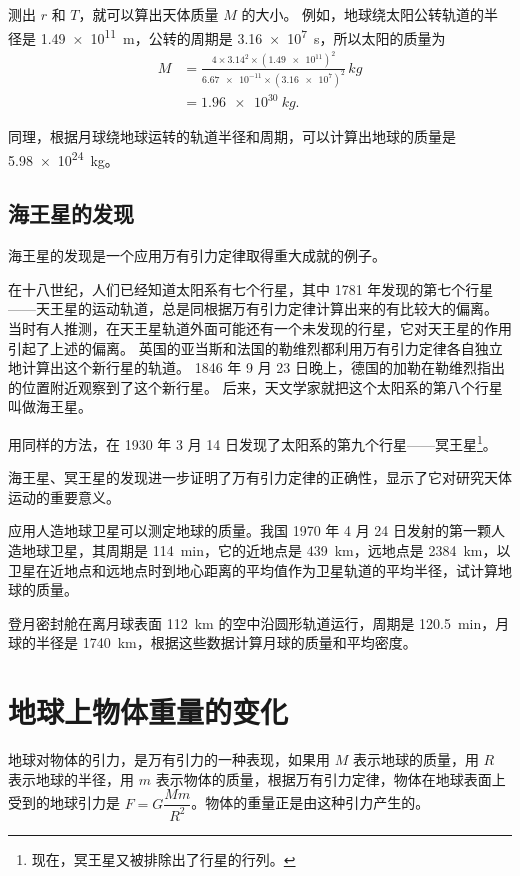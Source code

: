 测出 $r$ 和 $T$，就可以算出天体质量 $M$ 的大小。
例如，地球绕太阳公转轨道的半径是 \qty{1.49e11}{m}，公转的周期是 \qty{3.16e7}{s}，所以太阳的质量为
\[\begin{split}
M&= \frac{4\times 3.14^2\times (\num{1.49e11})^2}{\num{6.67e-11}\times (\num{3.16e7})^2}\,\unit{kg}\\
&=\qty{1.96e30}{kg}.
\end{split} \]

同理，根据月球绕地球运转的轨道半径和周期，可以计算出地球的质量是 \qty{5.98e24}{kg}。

\subsection{海王星的发现} 
海王星的发现是一个应用万有引力定律取得重大成就的例子。

在十八世纪，人们已经知道太阳系有七个行星，其中 1781 年发现的第七个行星——天王星的运动轨道，总是同根据万有引力定律计算出来的有比较大的偏离。
当时有人推测，在天王星轨道外面可能还有一个未发现的行星，它对天王星的作用引起了上述的偏离。
英国的亚当斯和法国的勒维烈都利用万有引力定律各自独立地计算出这个新行星的轨道。
1846 年 9 月 23 日晚上，德国的加勒在勒维烈指出的位置附近观察到了这个新行星。
后来，天文学家就把这个太阳系的第八个行星叫做海王星。

用同样的方法，在 1930 年 3 月 14 日发现了太阳系的第九个行星——冥王星\footnote{现在，冥王星又被排除出了行星的行列。}。

海王星、冥王星的发现进一步证明了万有引力定律的正确性，显示了它对研究天体运动的重要意义。

\begin{Practice}
\begin{question}
	\item 应用人造地球卫星可以测定地球的质量。我国 1970 年 4 月 24 日发射的第一颗人造地球卫星，其周期是 \qty{114}{min}，它的近地点是 \qty{439}{km}，远地点是 \qty{2384}{km}，以卫星在近地点和远地点时到地心距离的平均值作为卫星轨道的平均半径，试计算地球的质量。
	\item 登月密封舱在离月球表面 \qty{112}{km} 的空中沿圆形轨道运行，周期是 \qty{120.5}{min}，月球的半径是 \qty{1740}{km}，根据这些数据计算月球的质量和平均密度。
\end{question}
\end{Practice}


\section{地球上物体重量的变化}
{\linespread{1.6}\selectfont
地球对物体的引力，是万有引力的一种表现，如果用 $M$ 表示地球的质量，用 $R$ 表示地球的半径，用 $m$ 表示物体的质量，根据万有引力定律，物体在地球表面上受到的地球引力是 $F=G\dfrac{Mm}{R^2}$。物体的重量正是由这种引力产生的。\par}

